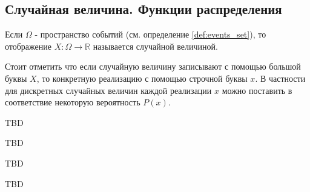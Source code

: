 \subsection{Случайная величина. Функции распределения}

\begin{definition}
\label{def:random_variable}
Если $\Omega$ - пространство событий (см. определение \autoref{def:events_set}), то 
отображение $X: \Omega \to \mathbb{R}$ называется случайной
величиной. 
\end{definition}

Стоит отметить что если случайную величину записывают с помощью
большой буквы $X$, то конкретную реализацию с помощью строчной буквы
$x$. В частности для дискретных случайных величин каждой реализации
$x$ можно поставить в соответствие некоторую вероятность
$P\left(x\right)$. 

\begin{definition}
TBD
\end{definition}

\begin{definition}
TBD
\end{definition}

\begin{definition}
TBD
\end{definition}


TBD
